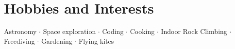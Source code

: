 \documentclass[10pt,a4paper,sans,unicode,colorlinks,urlcolor=blue]{moderncv} %
\begin{document}


\section{Hobbies and Interests}

\renewcommand{\listitemsymbol}{-~} %

Astronomy $\cdot$ Space exploration $\cdot$ Coding $\cdot$ Cooking $\cdot$ Indoor Rock Climbing $\cdot$ Freediving $\cdot$ Gardening $\cdot$ Flying kites



\end{document}

